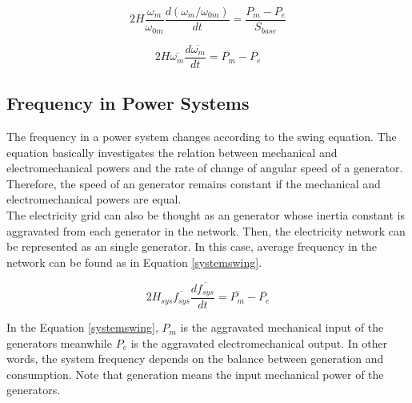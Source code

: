 \begin{equation}
2H\frac{\omega_{m}}{\omega_{0m}}\frac{d(\omega_{m}/\omega_{0m})}{dt}=\frac{P_{m}-P_{e}}{S_{base}}
\label{eqmotion4}
\end{equation}

\begin{equation}
2H\overline{\omega_{m}}\frac{d\overline{\omega_{m}}}{dt}=\overline{P_{m}}-\overline{P_{e}}
\label{eqmotion5}
\end{equation}

\subsection{Frequency in Power Systems}
The frequency in a power system changes according to the swing equation. The equation basically investigates the relation between mechanical and electromechanical powers and the rate of change of angular speed of a generator. Therefore, the speed of an generator remains constant if the mechanical and electromechanical powers are equal.\\
The electricity grid can also be thought as an generator whose inertia constant is aggravated from each generator in the network. Then, the electricity network can be represented as an single generator. In this case, average frequency in the network can be found as in Equation \ref{systemswing}. 

\begin{equation}
\label{systemswing}
2H_{sys}\overline{f_{sys}}\frac{d\overline{f_{sys}}}{dt}=\overline{P_{m}}-\overline{P_{e}}
\end{equation}

In the Equation \ref{systemswing}, $P_{m}$ is the aggravated mechanical input of the generators meanwhile $P_{e}$ is the aggravated electromechanical output. In other words, the system frequency depends on the balance between generation and consumption. Note that generation means the input mechanical power of the generators. 